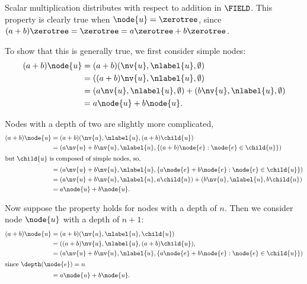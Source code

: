 \begin{remark}\label{distribution}
  Scalar multiplication distributes with respect to addition in
  $\FIELD$.  This property is clearly true when \(\node{u}
  = \zerotree\), since \((a+b)\zerotree = \zerotree =
  a\zerotree+b\zerotree\).

  To show that this is generally true, we first consider simple nodes:
  \begin{align*}
   (a + b)\node{u} &= (a + b) (\nv{u}, \nlabel{u}, \emptyset) \\
   &= ((a + b)\nv{u}, \nlabel{u}, \emptyset) \\
   &= (a\nv{u}, \nlabel{u}, \emptyset) + (b  \nv{u}, \nlabel{u}, \emptyset) \\
   &= a \node{u} + b \node{u}.
  \end{align*}

  Nodes with a depth of two are slightly more complicated, 
  \begin{align*}
     (a + b)\node{u} &= (a + b) (\nv{u}, \nlabel{u}, (a + b)\child{u}) \\
     &= (a\nv{u} + b  \nv{u}, \nlabel{u}, \{(a + b)\node{e}:\node{e}\in\child{u}\}) \\
     \intertext{but \(\child{u}\) is composed of simple nodes, so,}
     &= (a\nv{u} + b  \nv{u}, \nlabel{u}, \{a \node{e} + b \node{e}:\node{e}\in\child{u}\}) \\
     &= (a\nv{u} + b  \nv{u}, \nlabel{u}, a\child{u}) + (b  \nv{u}, \nlabel{u}, b\child{u}) \\
     &= a \node{u} + b \node{u}.
 \end{align*}

 Now suppose the property holds for nodes with a depth of \(n\).
 Then we consider node \(\node{u}\) with a depth of \(n+1\):
 \begin{align*}
     (a + b)\node{u} &= (a + b) (\nv{u}, \nlabel{u}, \child{u}) \\
     &= ((a + b)\nv{u}, \nlabel{u}, (a + b)\child{u}), \\
     &= (a\nv{u} + b  \nv{u}, \nlabel{u}, \{a \node{e} + b \node{e}:\node{e}\in\child{u}\}) \\
   \intertext{since \(\depth(\node{e}) = n\)}
     &= a \node{u} + b \node{u}.
 \end{align*}
 

\end{remark}
